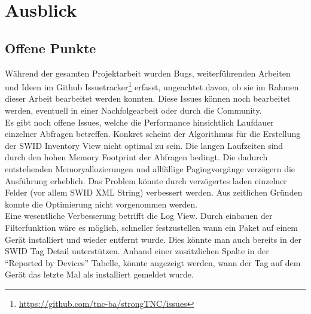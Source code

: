 \chapter{Ausblick}

\section{Offene Punkte} Während der gesamten Projektarbeit wurden Bugs,
weiterführenden Arbeiten und Ideen im Github
Issuetracker\footnote{\url{https://github.com/tnc-ba/strongTNC/issues}} erfasst,
ungeachtet davon, ob sie im Rahmen dieser Arbeit bearbeitet werden konnten.
Diese Issues können noch bearbeitet werden, eventuell in einer Nachfolgearbeit
oder durch die Community.\\
Es gibt noch offene Issues, welche die Performance
hinsichtlich Laufdauer einzelner Abfragen betreffen. Konkret scheint der
Algorithmus für die Erstellung der SWID Inventory View nicht optimal zu sein.
Die langen Laufzeiten sind durch den hohen Memory Footprint der Abfragen
bedingt. Die dadurch entstehenden Memoryallozierungen und allfällige
Pagingvorgänge verzögern die Ausführung erheblich. Das Problem könnte durch
verzögertes laden einzelner Felder (vor allem SWID XML String) verbessert
werden. Aus zeitlichen Gründen konnte die Optimierung nicht vorgenommen
werden.\\ Eine wesentliche Verbesserung betrifft die Log View. Durch einbauen
der Filterfunktion wäre es möglich, schneller festzustellen wann ein Paket auf
einem Gerät installiert und wieder entfernt wurde. Dies könnte man auch bereits
in der SWID Tag Detail unterstützen. Anhand einer zusätzlichen Spalte in der
\enquote{Reported by Devices} Tabelle, könnte angezeigt werden, wann der Tag auf
dem Gerät das letzte Mal als installiert gemeldet wurde.

